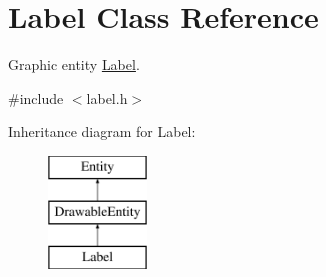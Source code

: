 \hypertarget{class_label}{}\section{Label Class Reference}
\label{class_label}


Graphic entity \hyperlink{class_label}{Label}.  




{\ttfamily \#include $<$label.\+h$>$}

Inheritance diagram for Label\+:\begin{figure}[H]
\begin{center}
\leavevmode
\includegraphics[height=3.000000cm]{class_label}
\end{center}
\end{figure}
